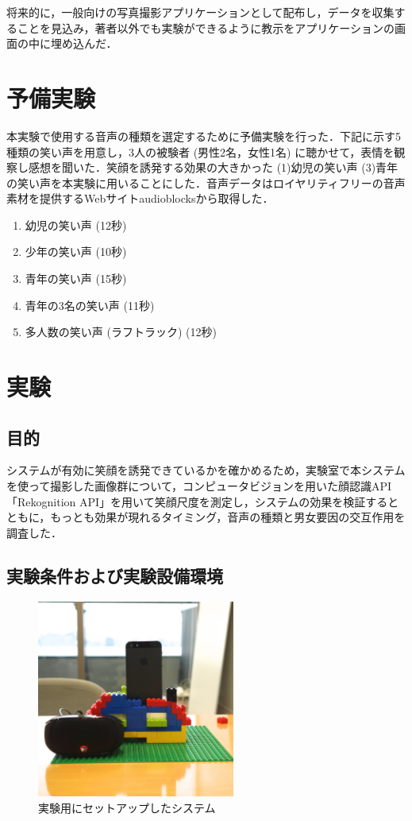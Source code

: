 \documentclass[submit,techreq]{ec2014}
\begin{document}
将来的に，一般向けの写真撮影アプリケーションとして配布し，データを収集することを見込み，著者以外でも実験ができるように教示をアプリケーションの画面の中に埋め込んだ．

\section{予備実験}

本実験で使用する音声の種類を選定するために予備実験を行った．下記に示す5種類の笑い声を用意し，3人の被験者 (男性2名，女性1名) に聴かせて，表情を観察し感想を聞いた．笑顔を誘発する効果の大きかった (1)幼児の笑い声 (3)青年の笑い声を本実験に用いることにした．音声データはロイヤリティフリーの音声素材を提供するWebサイトaudioblocks\cite{AudioBlocks}から取得した．

\begin{enumerate}
 \item 幼児の笑い声 (12秒)
 \item 少年の笑い声 (10秒)
 \item 青年の笑い声 (15秒)
 \item 青年の3名の笑い声 (11秒)
 \item 多人数の笑い声 (ラフトラック) (12秒)
\end{enumerate}

\section{実験}

\subsection{目的}

システムが有効に笑顔を誘発できているかを確かめるため，実験室で本システムを使って撮影した画像群について，コンピュータビジョンを用いた顔認識API「Rekognition API」を用いて笑顔尺度を測定し，システムの効果を検証するとともに，もっとも効果が現れるタイミング，音声の種類と男女要因の交互作用を調査した．

\subsection{実験条件および実験設備環境}

\begin{figure}[h!]
  \centering  
\includegraphics[width=65mm, bb=0 0 2404 2404]{images/system.jpg}
\caption{実験用にセットアップしたシステム}
  \label{recursive}
\end{figure}
\end{document}
